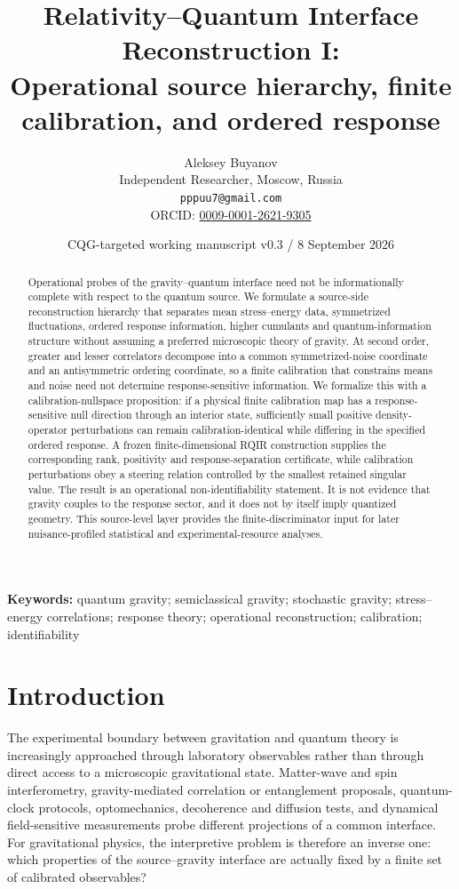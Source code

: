 \documentclass[12pt]{article}
\title{Relativity--Quantum Interface Reconstruction I:\\
Operational source hierarchy, finite calibration, and ordered response}
\author{Aleksey Buyanov\\
Independent Researcher, Moscow, Russia\\
\texttt{pppuu7@gmail.com}\\
ORCID: \href{https://orcid.org/0009-0001-2621-9305}{0009-0001-2621-9305}}
\date{CQG-targeted working manuscript v0.3 / 8 September 2026}
\begin{document}
\maketitle

\begin{abstract}
Operational probes of the gravity--quantum interface need not be informationally complete with respect to the quantum source. We formulate a source-side reconstruction hierarchy that separates mean stress--energy data, symmetrized fluctuations, ordered response information, higher cumulants and quantum-information structure without assuming a preferred microscopic theory of gravity. At second order, greater and lesser correlators decompose into a common symmetrized-noise coordinate and an antisymmetric ordering coordinate, so a finite calibration that constrains means and noise need not determine response-sensitive information. We formalize this with a calibration-nullspace proposition: if a physical finite calibration map has a response-sensitive null direction through an interior state, sufficiently small positive density-operator perturbations can remain calibration-identical while differing in the specified ordered response. A frozen finite-dimensional RQIR construction supplies the corresponding rank, positivity and response-separation certificate, while calibration perturbations obey a steering relation controlled by the smallest retained singular value. The result is an operational non-identifiability statement. It is not evidence that gravity couples to the response sector, and it does not by itself imply quantized geometry. This source-level layer provides the finite-discriminator input for later nuisance-profiled statistical and experimental-resource analyses.
\end{abstract}

\noindent\textbf{Keywords:} quantum gravity; semiclassical gravity; stochastic gravity; stress--energy correlations; response theory; operational reconstruction; calibration; identifiability

\section{Introduction}

The experimental boundary between gravitation and quantum theory is increasingly approached through laboratory observables rather than through direct access to a microscopic gravitational state. Matter-wave and spin interferometry, gravity-mediated correlation or entanglement proposals, quantum-clock protocols, optomechanics, decoherence and diffusion tests, and dynamical field-sensitive measurements probe different projections of a common interface. For gravitational physics, the interpretive problem is therefore an inverse one: which properties of the source--gravity interface are actually fixed by a finite set of calibrated observables?
\end{document}
